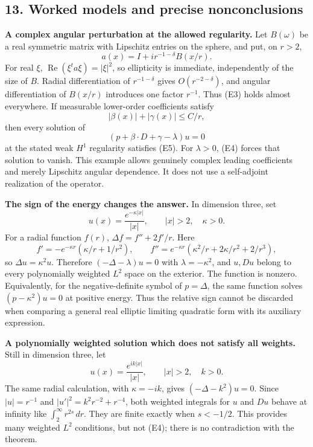 \documentclass[
  11pt,
]{article}
\begin{document}
\subsection{13. Worked models and precise
nonconclusions}\label{worked-models-and-precise-nonconclusions}

\textbf{A complex angular perturbation at the allowed regularity.} Let
\(B(\omega)\) be a real symmetric matrix with Lipschitz entries on the
sphere, and put, on \(r>2\), \[
               a(x)=I+i r^{-1-\delta}B(x/r).                    \tag{E73}
\] For real \(\xi\), \(\operatorname{Re}(\xi^ta\xi)=|\xi|^2\), so
ellipticity is immediate, independently of the size of \(B\). Radial
differentiation of \(r^{-1-\delta}\) gives \(O(r^{-2-\delta})\), and
angular differentiation of \(B(x/r)\) introduces one factor \(r^{-1}\).
Thus (E3) holds almost everywhere. If measurable lower-order
coefficients satisfy \[
 |\beta(x)|+|\gamma(x)|\leq C/r,
\] then every solution of \[
                  (p+\beta\cdot D+\gamma-\lambda)u=0
\] at the stated weak \(H^1\) regularity satisfies (E5). For
\(\lambda>0\), (E4) forces that solution to vanish. This example allows
genuinely complex leading coefficients and merely Lipschitz angular
dependence. It does not use a self-adjoint realization of the operator.

\textbf{The sign of the energy changes the answer.} In dimension three,
set \[
               u(x)=\frac{e^{-\kappa|x|}}{|x|},
               \qquad |x|>2,\quad \kappa>0.                    \tag{E74}
\] For a radial function \(f(r)\), \(\Delta f=f''+2f'/r\). Here \[
 f'=-e^{-\kappa r}(\kappa/r+1/r^2),\qquad
 f''=e^{-\kappa r}(\kappa^2/r+2\kappa/r^2+2/r^3),
\] so \(\Delta u=\kappa^2u\). Therefore \((-\Delta-\lambda)u=0\) with
\(\lambda=-\kappa^2\), and \(u,Du\) belong to every polynomially
weighted \(L^2\) space on the exterior. The function is nonzero.
Equivalently, for the negative-definite symbol of \(p=\Delta\), the same
function solves \((p-\kappa^2)u=0\) at positive energy. Thus the
relative sign cannot be discarded when comparing a general real elliptic
limiting quadratic form with its auxiliary expression.

\textbf{A polynomially weighted solution which does not satisfy all
weights.} Still in dimension three, let \[
                    u(x)=\frac{e^{ik|x|}}{|x|},
                    \qquad |x|>2,\quad k>0.                    \tag{E75}
\] The same radial calculation, with \(\kappa=-ik\), gives
\((-\Delta-k^2)u=0\). Since \(|u|=r^{-1}\) and
\(|u'|^2=k^2r^{-2}+r^{-4}\), both weighted integrals for \(u\) and
\(Du\) behave at infinity like \(\int_2^\infty r^{2s}\,dr\). They are
finite exactly when \(s<-1/2\). This provides many weighted \(L^2\)
conditions, but not (E4); there is no contradiction with the theorem.
\end{document}
